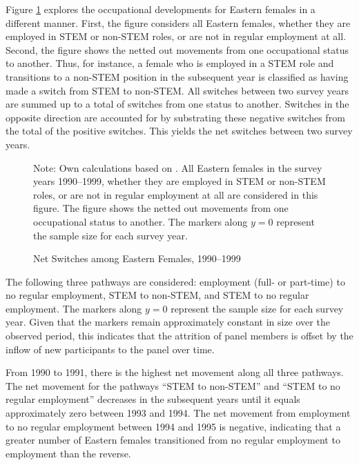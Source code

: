 \documentclass[a4paper, oneside, hyperfootnotes = false]{article}
\begin{document}
{Figure \ref{fig:netswitches} explores the occupational developments for Eastern females in a different manner.
First, the figure considers all Eastern females, whether they are employed in STEM or non-STEM roles, or are not in regular employment at all.
Second, the figure shows the netted out movements from one occupational status to another.
Thus, for instance, a female who is employed in a STEM role and transitions to a non-STEM position in the subsequent year is classified as having made a switch from STEM to non-STEM.
All switches between two survey years are summed up to a total of switches from one status to another.
Switches in the opposite direction are accounted for by substrating these negative switches from the total of the positive switches.
This yields the net switches between two survey years.

\begin{figure}[ht]
	\centering
	\caption{Net Switches among Eastern Females, 1990--1999}
	\label{fig:netswitches}
	\fontsize{9pt}{11pt}\selectfont
	\def\svgwidth{.9\textwidth}
	
	\vspace{2mm}
	\parbox{10cm}{
		\linespread{1}\footnotesize Note: Own calculations based on \cite{SOEP2023}. All Eastern females in the survey years 1990--1999, whether they are employed in STEM or non-STEM roles, or are not in regular employment at all are considered in this figure. The figure shows the netted out movements from one occupational status to another. The markers along $y = 0$ represent the sample size for each survey year.}
\end{figure}

The following three pathways are considered: employment (full- or part-time) to no regular employment, STEM to non-STEM, and STEM to no regular employment.
The markers along $y = 0$ represent the sample size for each survey year.
Given that the markers remain approximately constant in size over the observed period, this indicates that the attrition of panel members is offset by the inflow of new participants to the panel over time.

From 1990 to 1991, there is the highest net movement along all three pathways.
The net movement for the pathways ``STEM to non-STEM'' and ``STEM to no regular employment'' decreases in the subsequent years until it equals approximately zero between 1993 and 1994.
The net movement from employment to no regular employment between 1994 and 1995 is negative, indicating that a greater number of Eastern females transitioned from no regular employment to employment than the reverse.

}
\end{document}
